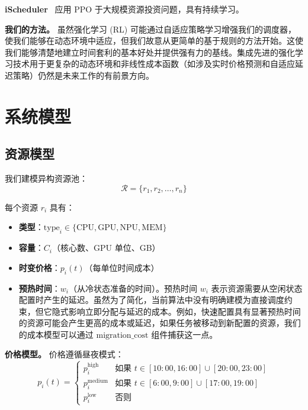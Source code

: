 \documentclass[10pt,a4paper]{article}
\begin{document}
\textbf{iScheduler}~\cite{iScheduler2020} 应用 PPO 于大规模资源投资问题，具有持续学习。

\textbf{我们的方法。} 虽然强化学习 (RL) 可能通过自适应策略学习增强我们的调度器，使我们能够在动态环境中适应，但我们故意从更简单的基于规则的方法开始。这使我们能够清楚地建立时间套利的基本好处并提供强有力的基线。集成先进的强化学习技术用于更复杂的动态环境和非线性成本函数（如涉及实时价格预测和自适应延迟策略）仍然是未来工作的有前景方向。

\section{系统模型}
\label{sec:model}

\subsection{资源模型}

我们建模异构资源池：
\begin{equation}
\mathcal{R} = \{r_1, r_2, \ldots, r_n\}
\end{equation}

每个资源 $r_i$ 具有：
\begin{itemize}
    \item \textbf{类型}：$\text{type}_i \in \{\text{CPU}, \text{GPU}, \text{NPU}, \text{MEM}\}$
    \item \textbf{容量}：$C_i$（核心数、GPU 单位、GB）
    \item \textbf{时变价格}：$p_i(t)$（每单位时间成本）
    \item \textbf{预热时间}：$w_i$（从冷状态准备的时间）。预热时间 $w_i$ 表示资源需要从空闲状态配置时产生的延迟。虽然为了简化，当前算法中没有明确建模为直接调度约束，但它隐式影响立即分配与延迟的成本。例如，快速配置具有显著预热时间的资源可能会产生更高的成本或延迟，如果任务被移动到新配置的资源，我们的成本模型可以通过 $\text{migration\_cost}$ 组件捕获这一点。
\end{itemize}

\textbf{价格模型。} 价格遵循昼夜模式：
\begin{equation}
p_i(t) = \begin{cases}
p_i^{\text{high}} & \text{如果 } t \in [10:00, 16:00] \cup [20:00, 23:00] \\
p_i^{\text{medium}} & \text{如果 } t \in [6:00, 9:00] \cup [17:00, 19:00] \\
p_i^{\text{low}} & \text{否则}
\end{cases}
\end{equation}
\end{document}
